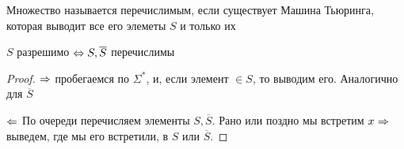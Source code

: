 \begin{definition}
    Множество называется перечислимым, если существует Машина Тьюринга, которая выводит все его элеметы \(S\) и только их
\end{definition}

\begin{theorem}[Поста]
    \(S\) разрешимо \(\Leftrightarrow S, \overline{S}\) перечислимы
\end{theorem}
\begin{proof}
    \item[\(\Rightarrow\)] пробегаемся по \(\Sigma^*\), и, если элемент \(\in S\), то выводим его. Аналогично для \(\overline{S}\)
    \item[\(\Leftarrow\)] По очереди перечисляем элементы \(S, \overline{S}\). Рано или поздно мы встретим \(x \Rightarrow\) выведем, где мы его встретили, в \(S\) или \(\overline{S}\).
\end{proof}